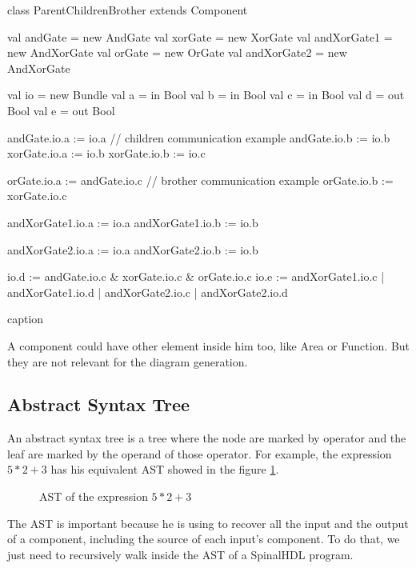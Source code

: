 \begin{listing} %
    \centering
    \begin{scalacode}
    class ParentChildrenBrother extends Component
    {
        val andGate = new AndGate
        val xorGate = new XorGate
        val andXorGate1 = new AndXorGate
        val orGate = new OrGate
        val andXorGate2 = new AndXorGate

        val io = new Bundle
        {
            val a = in Bool
            val b = in Bool
            val c = in Bool
            val d = out Bool
            val e = out Bool
        }

        andGate.io.a := io.a            // children communication example
        andGate.io.b := io.b
        xorGate.io.a := io.b
        xorGate.io.b := io.c

        orGate.io.a := andGate.io.c     // brother communication example
        orGate.io.b := xorGate.io.c     

        andXorGate1.io.a := io.a
        andXorGate1.io.b := io.b

        andXorGate2.io.a := io.a
        andXorGate2.io.b := io.b

        io.d := andGate.io.c & xorGate.io.c & orGate.io.c
        io.e := andXorGate1.io.c | andXorGate1.io.d | andXorGate2.io.c | andXorGate2.io.d
    }
    \end{scalacode}
    \caption{caption}
    \label{lst:HierarchicComponent-solo}
\end{listing} %

A component could have other element inside him too, like Area or Function. But they are not relevant for the diagram generation.


\subsection{Abstract Syntax Tree} %
\label{sub:Abstract Syntax Tree}

An abstract syntax tree is a tree where the node are marked by operator and the leaf are marked by the operand of those operator. For example, the expression $5 * 2 + 3$ has his equivalent AST showed in the figure \ref{fig:ast-example}.

\begin{figure}[] %
    \centering
    \caption{AST of the expression $5 * 2 + 3$}
    \label{fig:ast-example}
\end{figure} %

The AST is important because he is using to recover all the input and the output of a component, including the source of each input's component. To do that, we just need to recursively walk inside the AST of a SpinalHDL program.



